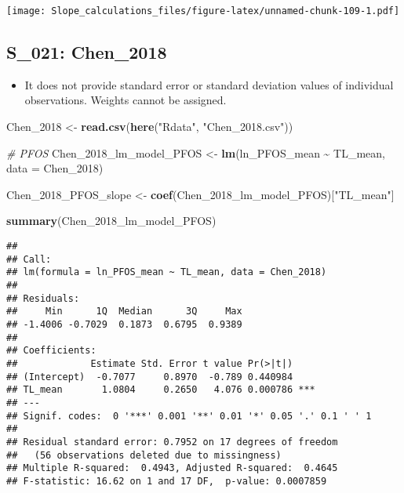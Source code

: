 \documentclass[
]{article}
\newenvironment{Shaded}{\begin{snugshade}}{\end{snugshade}}
\newcommand{\AttributeTok}[1]{\textcolor[rgb]{0.13,0.29,0.53}{#1}}
\newcommand{\CommentTok}[1]{\textcolor[rgb]{0.56,0.35,0.01}{\textit{#1}}}
\newcommand{\FunctionTok}[1]{\textcolor[rgb]{0.13,0.29,0.53}{\textbf{#1}}}
\newcommand{\NormalTok}[1]{#1}
\newcommand{\OtherTok}[1]{\textcolor[rgb]{0.56,0.35,0.01}{#1}}
\newcommand{\SpecialCharTok}[1]{\textcolor[rgb]{0.81,0.36,0.00}{\textbf{#1}}}
\newcommand{\StringTok}[1]{\textcolor[rgb]{0.31,0.60,0.02}{#1}}
\providecommand{\tightlist}{%
  \setlength{\itemsep}{0pt}\setlength{\parskip}{0pt}}
\begin{document}
\texttt{[image: Slope\_calculations\_files/figure-latex/unnamed-chunk-109-1.pdf]}

\subsection{S\_021: Chen\_2018}\label{s_021-chen_2018-1}

\begin{itemize}
\tightlist
\item
  It does not provide standard error or standard deviation values of
  individual observations. Weights cannot be assigned.
\end{itemize}

\begin{Shaded}
\begin{Highlighting}[]
\NormalTok{Chen\_2018 }\OtherTok{\textless{}{-}} \FunctionTok{read.csv}\NormalTok{(}\FunctionTok{here}\NormalTok{(}\StringTok{"Rdata"}\NormalTok{, }\StringTok{"Chen\_2018.csv"}\NormalTok{))}

\CommentTok{\# PFOS}
\NormalTok{Chen\_2018\_lm\_model\_PFOS }\OtherTok{\textless{}{-}} \FunctionTok{lm}\NormalTok{(ln\_PFOS\_mean }\SpecialCharTok{\textasciitilde{}}\NormalTok{ TL\_mean,}
                             \AttributeTok{data =}\NormalTok{ Chen\_2018)}

\NormalTok{Chen\_2018\_PFOS\_slope }\OtherTok{\textless{}{-}} \FunctionTok{coef}\NormalTok{(Chen\_2018\_lm\_model\_PFOS)[}\StringTok{"TL\_mean"}\NormalTok{]}

\FunctionTok{summary}\NormalTok{(Chen\_2018\_lm\_model\_PFOS)}
\end{Highlighting}
\end{Shaded}

\begin{verbatim}
## 
## Call:
## lm(formula = ln_PFOS_mean ~ TL_mean, data = Chen_2018)
## 
## Residuals:
##     Min      1Q  Median      3Q     Max 
## -1.4006 -0.7029  0.1873  0.6795  0.9389 
## 
## Coefficients:
##             Estimate Std. Error t value Pr(>|t|)    
## (Intercept)  -0.7077     0.8970  -0.789 0.440984    
## TL_mean       1.0804     0.2650   4.076 0.000786 ***
## ---
## Signif. codes:  0 '***' 0.001 '**' 0.01 '*' 0.05 '.' 0.1 ' ' 1
## 
## Residual standard error: 0.7952 on 17 degrees of freedom
##   (56 observations deleted due to missingness)
## Multiple R-squared:  0.4943, Adjusted R-squared:  0.4645 
## F-statistic: 16.62 on 1 and 17 DF,  p-value: 0.0007859
\end{verbatim}
\end{document}
